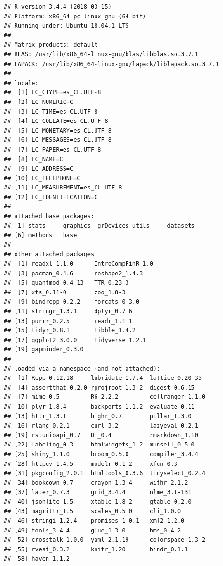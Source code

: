 \documentclass[12pt,]{book}
\begin{document}
\begin{verbatim}
## R version 3.4.4 (2018-03-15)
## Platform: x86_64-pc-linux-gnu (64-bit)
## Running under: Ubuntu 18.04.1 LTS
## 
## Matrix products: default
## BLAS: /usr/lib/x86_64-linux-gnu/blas/libblas.so.3.7.1
## LAPACK: /usr/lib/x86_64-linux-gnu/lapack/liblapack.so.3.7.1
## 
## locale:
##  [1] LC_CTYPE=es_CL.UTF-8      
##  [2] LC_NUMERIC=C              
##  [3] LC_TIME=es_CL.UTF-8       
##  [4] LC_COLLATE=es_CL.UTF-8    
##  [5] LC_MONETARY=es_CL.UTF-8   
##  [6] LC_MESSAGES=es_CL.UTF-8   
##  [7] LC_PAPER=es_CL.UTF-8      
##  [8] LC_NAME=C                 
##  [9] LC_ADDRESS=C              
## [10] LC_TELEPHONE=C            
## [11] LC_MEASUREMENT=es_CL.UTF-8
## [12] LC_IDENTIFICATION=C       
## 
## attached base packages:
## [1] stats     graphics  grDevices utils     datasets 
## [6] methods   base     
## 
## other attached packages:
##  [1] readxl_1.1.0      IntroCompFinR_1.0
##  [3] pacman_0.4.6      reshape2_1.4.3   
##  [5] quantmod_0.4-13   TTR_0.23-3       
##  [7] xts_0.11-0        zoo_1.8-3        
##  [9] bindrcpp_0.2.2    forcats_0.3.0    
## [11] stringr_1.3.1     dplyr_0.7.6      
## [13] purrr_0.2.5       readr_1.1.1      
## [15] tidyr_0.8.1       tibble_1.4.2     
## [17] ggplot2_3.0.0     tidyverse_1.2.1  
## [19] gapminder_0.3.0  
## 
## loaded via a namespace (and not attached):
##  [1] Rcpp_0.12.18     lubridate_1.7.4  lattice_0.20-35 
##  [4] assertthat_0.2.0 rprojroot_1.3-2  digest_0.6.15   
##  [7] mime_0.5         R6_2.2.2         cellranger_1.1.0
## [10] plyr_1.8.4       backports_1.1.2  evaluate_0.11   
## [13] httr_1.3.1       highr_0.7        pillar_1.3.0    
## [16] rlang_0.2.1      curl_3.2         lazyeval_0.2.1  
## [19] rstudioapi_0.7   DT_0.4           rmarkdown_1.10  
## [22] labeling_0.3     htmlwidgets_1.2  munsell_0.5.0   
## [25] shiny_1.1.0      broom_0.5.0      compiler_3.4.4  
## [28] httpuv_1.4.5     modelr_0.1.2     xfun_0.3        
## [31] pkgconfig_2.0.1  htmltools_0.3.6  tidyselect_0.2.4
## [34] bookdown_0.7     crayon_1.3.4     withr_2.1.2     
## [37] later_0.7.3      grid_3.4.4       nlme_3.1-131    
## [40] jsonlite_1.5     xtable_1.8-2     gtable_0.2.0    
## [43] magrittr_1.5     scales_0.5.0     cli_1.0.0       
## [46] stringi_1.2.4    promises_1.0.1   xml2_1.2.0      
## [49] tools_3.4.4      glue_1.3.0       hms_0.4.2       
## [52] crosstalk_1.0.0  yaml_2.1.19      colorspace_1.3-2
## [55] rvest_0.3.2      knitr_1.20       bindr_0.1.1     
## [58] haven_1.1.2
\end{verbatim}
\end{document}
